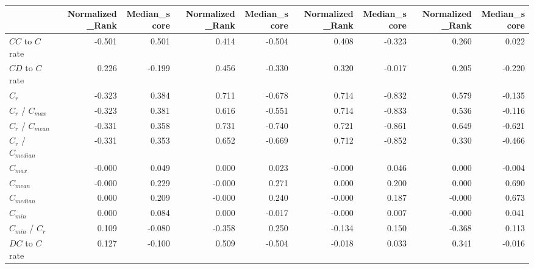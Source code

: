 \begin{tabular}{lrrrrrrrr}
\toprule
{} &  Normalized_Rank &  Median_score &  Normalized_Rank &  Median_score &  Normalized_Rank &  Median_score &  Normalized_Rank &  Median_score \\
\midrule
$CC$ to $C$ rate     &           -0.501 &         0.501 &            0.414 &        -0.504 &            0.408 &        -0.323 &            0.260 &         0.022 \\
$CD$ to $C$ rate     &            0.226 &        -0.199 &            0.456 &        -0.330 &            0.320 &        -0.017 &            0.205 &        -0.220 \\
$C_r$                &           -0.323 &         0.384 &            0.711 &        -0.678 &            0.714 &        -0.832 &            0.579 &        -0.135 \\
$C_r$ / $C_{max}$    &           -0.323 &         0.381 &            0.616 &        -0.551 &            0.714 &        -0.833 &            0.536 &        -0.116 \\
$C_r$ / $C_{mean}$   &           -0.331 &         0.358 &            0.731 &        -0.740 &            0.721 &        -0.861 &            0.649 &        -0.621 \\
$C_r$ / $C_{median}$ &           -0.331 &         0.353 &            0.652 &        -0.669 &            0.712 &        -0.852 &            0.330 &        -0.466 \\
$C_{max}$            &           -0.000 &         0.049 &            0.000 &         0.023 &           -0.000 &         0.046 &            0.000 &        -0.004 \\
$C_{mean}$           &           -0.000 &         0.229 &           -0.000 &         0.271 &            0.000 &         0.200 &            0.000 &         0.690 \\
$C_{median}$         &            0.000 &         0.209 &           -0.000 &         0.240 &           -0.000 &         0.187 &           -0.000 &         0.673 \\
$C_{min}$            &            0.000 &         0.084 &            0.000 &        -0.017 &           -0.000 &         0.007 &           -0.000 &         0.041 \\
$C_{min}$ / $C_r$    &            0.109 &        -0.080 &           -0.358 &         0.250 &           -0.134 &         0.150 &           -0.368 &         0.113 \\
$DC$ to $C$ rate     &            0.127 &        -0.100 &            0.509 &        -0.504 &           -0.018 &         0.033 &            0.341 &        -0.016 \\

\end{tabular}
